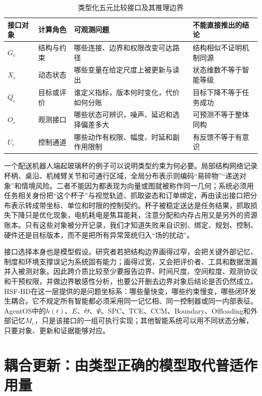 \begin{table}[htbp]
\centering
\small
\renewcommand{\arraystretch}{1.35}
\begin{tabularx}{\textwidth}{p{}|p{}|X|X}
\toprule
\rowcolor{structurecolor!20} \textbf{接口对象} & \textbf{计算角色} & \textbf{可观测问题} & \textbf{不能直接推出的结论} \\
\midrule
$G_c$ & 结构与约束 & 哪些连接、边界和权限改变可达路径 & 结构相似不证明机制同源 \\
\hline
$X_c$ & 动态状态 & 哪些变量在给定尺度上被更新与读出 & 状态维数不等于智能等级 \\
\hline
$Q_c$ & 目标或评价 & 谁定义指标，版本何时变化，代价如何分账 & 目标下降不等于任务成功 \\
\hline
$O_c$ & 观测接口 & 哪些状态可辨识，噪声、延迟和选择偏差多大 & 可预测不等于整体同构 \\
\hline
$U_c$ & 控制通道 & 哪些动作有权限、幅度、时延和副作用限制 & 有反馈不等于有意识 \\
\bottomrule
\end{tabularx}
\caption{类型化五元比较接口及其推理边界}
\label{tab:five_unified_variables}
\end{table}

一个配送机器人端起玻璃杯的例子可以说明类型约束为何必要。局部结构网络记录杯柄、桌沿、机械臂关节和可通行区域，全局分布表示则编码“易碎物”“递送对象”和情境风险。二者不能因为都表现为向量或图就被称作同一几何；系统必须用任务相关身份把“这个杯子”与视觉轨迹、抓取姿态和订单绑定，再由读出接口把分布表示转成带坐标、单位和时限的控制契约。杯子被稳定送达是任务结果，抓取损失下降只是优化现象，电机耗电是焦耳能耗，注意分配和内存占用又是另外的资源账本。只有这些对象被分开记录，我们才知道失败来自识别、绑定、规划、控制、硬件还是目标版本，而不是把所有异常笼统归入“场的扰动”。

接口选择本身也是模型假设。研究者若把结构边界画得过窄，会把关键外部记忆、制度和环境支撑误记为系统固有能力；画得过宽，又会把评价者、工具和数据泄漏并入被测对象。因此跨介质比较至少要报告边界、时间尺度、空间粒度、观测协议和干预权限，并做边界敏感性分析，也要公开删去边界对象后结论是否仍然成立。HSF-HD在这一层提供的是问题坐标系：哪些量快变，哪些约束慢变，哪些闭环发生耦合。它不规定所有智能都必须采用同一记忆相、同一控制器或同一内部表征。AgentOS中的$h(t)$、$E$、$\Theta$、$\Psi$、SPC、TCE、CCM、Boundary、Offloading和外部记忆$M_e$，只是该接口的一组可执行实现；其他智能系统可以用不同状态分解，只要对象、更新和证据能够对应。

\section{耦合更新：由类型正确的模型取代普适作用量}
\label{sec:unified_action_equations}

